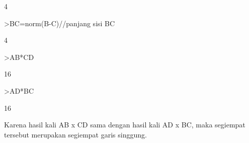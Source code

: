 \documentclass[12pt,arial,letterpaper]{book}
\begin{document}
\begin{eulercomment}
\begin{eulercomment}
\begin{eulercomment}
\begin{eulercomment}
\begin{eulercomment}
\begin{eulercomment}
\begin{eulercomment}
\begin{eulercomment}
\begin{eulercomment}
\begin{eulercomment}
\begin{eulercomment}
\begin{eulercomment}
\begin{eulercomment}
\begin{eulercomment}
\begin{eulercomment}
\begin{eulercomment}
\begin{eulercomment}
\begin{eulercomment}
\begin{eulercomment}
\begin{eulercomment}
\begin{eulercomment}
\begin{eulercomment}
\begin{eulercomment}
\begin{eulercomment}
\begin{eulercomment}
\begin{eulercomment}
\begin{eulercomment}
\begin{eulercomment}
\begin{eulercomment}
\begin{eulercomment}
\begin{eulercomment}
\begin{eulercomment}
\begin{euleroutput}
  4
\end{euleroutput}
\begin{eulerprompt}
>BC=norm(B-C)//panjang sisi BC
\end{eulerprompt}
\begin{euleroutput}
  4
\end{euleroutput}
\begin{eulerprompt}
>AB*CD
\end{eulerprompt}
\begin{euleroutput}
  16
\end{euleroutput}
\begin{eulerprompt}
>AD*BC
\end{eulerprompt}
\begin{euleroutput}
  16
\end{euleroutput}
\begin{eulercomment}
Karena hasil kali AB x CD sama dengan hasil kali AD x BC, maka
segiempat tersebut merupakan segiempat garis singgung.


\end{eulercomment}
\end{eulercomment}
\end{eulercomment}
\end{eulercomment}
\end{eulercomment}
\end{eulercomment}
\end{eulercomment}
\end{eulercomment}
\end{eulercomment}
\end{eulercomment}
\end{eulercomment}
\end{eulercomment}
\end{eulercomment}
\end{eulercomment}
\end{eulercomment}
\end{eulercomment}
\end{eulercomment}
\end{eulercomment}
\end{eulercomment}
\end{eulercomment}
\end{eulercomment}
\end{eulercomment}
\end{eulercomment}
\end{eulercomment}
\end{eulercomment}
\end{eulercomment}
\end{eulercomment}
\end{eulercomment}
\end{eulercomment}
\end{eulercomment}
\end{eulercomment}
\end{eulercomment}
\end{eulercomment}
\end{document}
